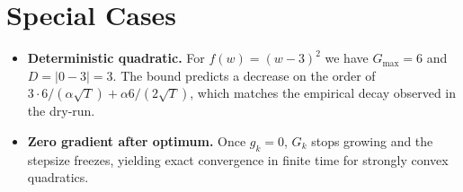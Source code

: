 \documentclass{article}
\begin{document}
\section*{Special Cases}
\begin{itemize}
\item \textbf{Deterministic quadratic.} For $f(w)=(w-3)^{2}$ we have $G_{\max}=6$ and $D=|0-3|=3$. The bound predicts a decrease on the order of $3\cdot6/( \alpha\sqrt{T})+\alpha 6/(2\sqrt{T})$, which matches the empirical decay observed in the dry‑run.
\item \textbf{Zero gradient after optimum.} Once $g_k=0$, $G_k$ stops growing and the stepsize freezes, yielding exact convergence in finite time for strongly convex quadratics.
\end{itemize}
\end{document}
